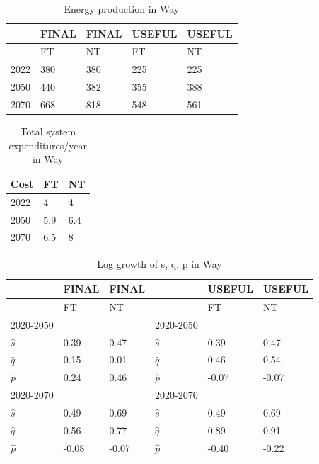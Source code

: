 \documentclass[11pt]{article}
\begin{document}
\begin{table}[h]
\centering
\caption{Energy production in Way}
\label{tab_q_way}
\begin{tabular}{@{}l|ll|ll@{}}
\toprule
     & FINAL & FINAL & USEFUL & USEFUL \\ \midrule
     & FT    & NT    & FT     & NT     \\ \midrule
2022 & 380   & 380   & 225    & 225    \\
2050 & 440   & 382   & 355    & 388    \\
2070 & 668   & 818   & 548    & 561    \\ \bottomrule
\end{tabular}
\end{table}


\begin{table}[h]
\centering
\caption{Total system expenditures/year in Way}
\label{tab_S_way}
\begin{tabular}{@{}lll@{}}
\toprule
Cost & FT  & NT  \\ \midrule
2022 & 4   & 4   \\
2050 & 5.9 & 6.4 \\
2070 & 6.5 & 8   \\ \bottomrule
\end{tabular}
\end{table}




\begin{table}[h]
\centering
\caption{Log growth of s, q, p in Way}
\label{tab_sqp_hat_way}
\begin{tabular}{@{}llllll@{}}
\toprule
                & FINAL       & FINAL &                 & USEFUL      & USEFUL \\ \midrule
                & FT          & NT    &                 & FT          & NT     \\ \midrule
2020-2050       &             &       & 2020-2050       &             &        \\ \midrule
$\hat{s}$            & 0.39        & 0.47  & $\hat{s}$            & 0.39        & 0.47   \\
$\hat{q}$            & 0.15        & 0.01  & $\hat{q}$            & 0.46        & 0.54   \\
$\hat{p}$            & 0.24        & 0.46  & $\hat{p}$            & -0.07       & -0.07  \\ \midrule
\multicolumn{2}{l}{2020-2070} &       & \multicolumn{2}{l}{2020-2070} &        \\ \midrule
$\hat{s}$            & 0.49        & 0.69  & $\hat{s}$            & 0.49        & 0.69   \\
$\hat{q}$            & 0.56        & 0.77  & $\hat{q}$            & 0.89        & 0.91   \\
$\hat{p}$            & -0.08       & -0.07 & $\hat{p}$            & -0.40       & -0.22  \\ \bottomrule
\end{tabular}
\end{table}
\end{document}
